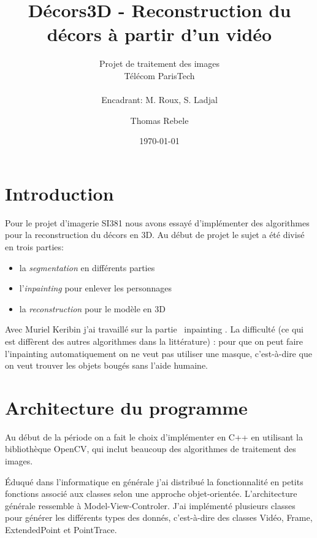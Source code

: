 \documentclass[8pt,twoside=off,titlepage=false, twocolumn]{scrartcl}
\begin{document}
\thispagestyle{empty}
\begin{titlepage}
\title{Décors3D - Reconstruction du décors à partir d'un vidéo}
\subtitle{Projet de traitement des images \\ Télécom ParisTech \\ \  \\Encadrant: 
M. Roux, S. Ladjal}
\author{Thomas Rebele}
\date{\today}
\end{titlepage}

\begingroup
 \makeatletter
 \maketitle
\endgroup


\section{Introduction}

Pour le projet d'imagerie SI381 nous avons essayé d'implémenter des algorithmes pour la reconstruction du décors en 3D. Au début de projet le sujet a été divisé en trois parties:
\begin{itemize}
\item la \emph{segmentation} en différents parties
\item l'\emph{inpainting} pour enlever les personnages
\item la \emph{reconstruction} pour le modèle en 3D
\end{itemize}

Avec Muriel Keribin j'ai travaillé sur la partie \flqq\ inpainting \frqq. La difficulté (ce qui est diffèrent des autres algorithmes dans la littérature) : pour que on peut faire l'inpainting automatiquement on ne veut pas utiliser une masque, c'est-à-dire que on veut trouver les objets bougés sans l'aide humaine.

\section{Architecture du programme}

Au début de la période on a fait le choix d'implémenter en C++ en utilisant la bibliothèque OpenCV, qui inclut beaucoup des algorithmes de traitement des images.

Éduqué dans l'informatique en générale j'ai distribué la fonctionnalité en petits fonctions associé aux classes selon une approche objet-orientée. L'architecture générale ressemble à Model-View-Controler. J'ai implémenté plusieurs classes pour générer les différents types des donnés, c'est-à-dire des classes Vidéo, Frame, ExtendedPoint et PointTrace.
\end{document}
